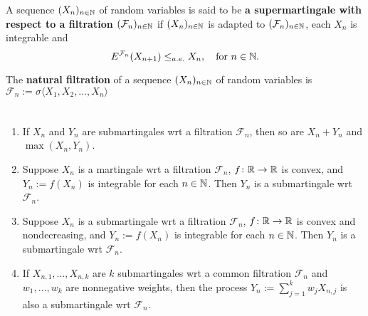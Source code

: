 \begin{definition}
A sequence $(X_n)_{n\in\Bbb N}$ of random variables is said to be {\bf a supermartingale with respect to a filtration $(\mathcal F_n)_{n\in\Bbb N}$} if $(X_n)_{n\in\Bbb N}$ is adapted to $(\mathcal F_n)_{n\in\Bbb N}$, each $X_n$ is integrable and
\[E^{\mathcal F_n} (X_{n+1}) \leq_{\tiny a.e.}X_n  ,\quad\text{for $n\in \Bbb N$}. \]
\end{definition}



\begin{definition}
The {\bf natural filtration} of a sequence $(X_n)_{n\in\Bbb N}$ of random variables is $\mathcal F_n:= \sigma\langle X_1, X_2, \ldots, X_n\rangle$
\end{definition}

\begin{example}
\end{example}

\begin{example}
\end{example}

\begin{example}
\end{example}

\begin{example}
\end{example}

\begin{example}
\end{example}

\begin{example}
\end{example}


\begin{theorem}
$\phantom{asdf}$
\begin{enumerate}
\item If $X_n$ and $Y_n$ are submartingales wrt a filtration $\mathcal F_n$, then so are $X_n+Y_n$ and $\max(X_n, Y_n)$.
\item Suppose $X_n$ is a martingale wrt a filtration $\mathcal F_n$, $f\colon\Bbb R\rightarrow \Bbb R$ is convex, and $Y_n:= f(X_n)$ is integrable for each $n\in\Bbb N$. Then $Y_n$ is a submartingale wrt $\mathcal F_n$.
\item Suppose $X_n$ is a submartingale wrt a filtration $\mathcal F_n$, $f\colon\Bbb R\rightarrow \Bbb R$  is convex and nondecreasing, and $Y_n:= f(X_n)$ is integrable for each $n\in\Bbb N$. Then $Y_n$ is a submartingale wrt $\mathcal F_n$.
\item If $X_{n,1}, \ldots, X_{n,k}$ are $k$ submartingales wrt a common filtration $\mathcal F_n$ and $w_1, \ldots, w_k$ are nonnegative weights, then the process $Y_n:=\sum_{j=1}^k w_j X_{n,j}$ is also a submartingale wrt $\mathcal F_n$.
\end{enumerate}
\end{theorem}




